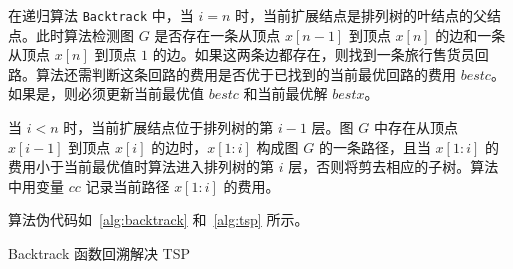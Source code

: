 在递归算法 \texttt{Backtrack} 中，当 $i = n$ 时，当前扩展结点是排列树的叶结点的父结点。此时算法检测图 $G$ 是否存在一条从顶点 $x[n-1]$ 到顶点 $x[n]$ 的边和一条从顶点 $x[n]$ 到顶点 $1$ 的边。如果这两条边都存在，则找到一条旅行售货员回路。算法还需判断这条回路的费用是否优于已找到的当前最优回路的费用 $bestc$。如果是，则必须更新当前最优值 $bestc$ 和当前最优解 $bestx$。

当 $i < n$ 时，当前扩展结点位于排列树的第 $i-1$ 层。图 $G$ 中存在从顶点 $x[i-1]$ 到顶点 $x[i]$ 的边时，$x[1:i]$ 构成图 $G$ 的一条路径，且当 $x[1:i]$ 的费用小于当前最优值时算法进入排列树的第 $i$ 层，否则将剪去相应的子树。算法中用变量 $cc$ 记录当前路径 $x[1:i]$ 的费用。

算法伪代码如~\autoref{alg:backtrack} 和~\autoref{alg:tsp} 所示。
\begin{algorithm}[htbp]
    \SetAlgoLined
    
    \caption{Backtrack 函数回溯解决 TSP}
    \label{alg:backtrack}
    
\end{algorithm}
